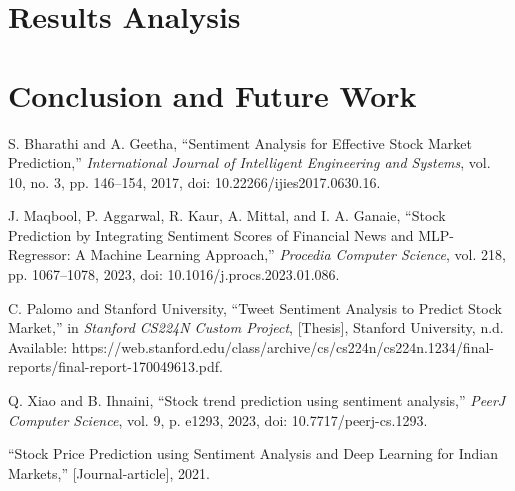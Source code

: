\documentclass[conference]{IEEEtran}
\begin{document}
\section{Results Analysis}

\section{Conclusion and Future Work}

\begin{thebibliography}{1}
S. Bharathi and A. Geetha, ``Sentiment Analysis for Effective Stock Market Prediction,'' \textit{International Journal of Intelligent Engineering and Systems}, vol. 10, no. 3, pp. 146--154, 2017, doi: 10.22266/ijies2017.0630.16.

J. Maqbool, P. Aggarwal, R. Kaur, A. Mittal, and I. A. Ganaie, ``Stock Prediction by Integrating Sentiment Scores of Financial News and MLP-Regressor: A Machine Learning Approach,'' \textit{Procedia Computer Science}, vol. 218, pp. 1067--1078, 2023, doi: 10.1016/j.procs.2023.01.086.

C. Palomo and Stanford University, ``Tweet Sentiment Analysis to Predict Stock Market,'' in \textit{Stanford CS224N Custom Project}, [Thesis], Stanford University, n.d. Available: https://web.stanford.edu/class/archive/cs/cs224n/cs224n.1234/final-reports/final-report-170049613.pdf.

Q. Xiao and B. Ihnaini, ``Stock trend prediction using sentiment analysis,'' \textit{PeerJ Computer Science}, vol. 9, p. e1293, 2023, doi: 10.7717/peerj-cs.1293.

``Stock Price Prediction using Sentiment Analysis and Deep Learning for Indian Markets,'' [Journal-article], 2021.
\end{thebibliography}
\end{document}
